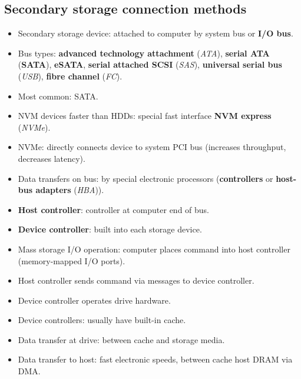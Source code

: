 \subsection{Secondary storage connection methods}
\begin{itemize}
    \item Secondary storage device: attached to computer by system bus or \textbf{I/O bus}.
    \item Bus types: \textbf{advanced technology attachment} (\textit{ATA}), \textbf{serial ATA} (\textbf{SATA}), \textbf{eSATA}, \textbf{serial attached SCSI} (\textit{SAS}), \textbf{universal serial bus} (\textit{USB}), \textbf{fibre channel} (\textit{FC}).
    \item Most common: SATA.
    \item NVM devices faster than HDDs: special fast interface \textbf{NVM express} (\textit{NVMe}).
    \item NVMe: directly connects device to system PCI bus (increases throughput, decreases latency).
    \item Data transfers on bus: by special electronic processors (\textbf{controllers} or \textbf{host-bus adapters} (\textit{HBA})).
    \item \textbf{Host controller}: controller at computer end of bus.
    \item \textbf{Device controller}: built into each storage device.
    \item Mass storage I/O operation: computer places command into host controller (memory-mapped I/O ports).
    \item Host controller sends command via messages to device controller.
    \item Device controller operates drive hardware.
    \item Device controllers: usually have built-in cache.
    \item Data transfer at drive: between cache and storage media.
    \item Data transfer to host: fast electronic speeds, between cache host DRAM via DMA.
\end{itemize}


